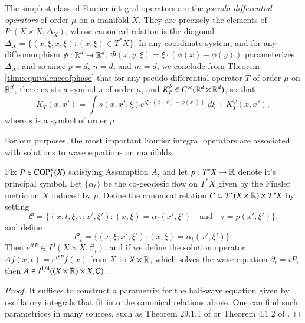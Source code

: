 The simplest class of Fourier integral operators are the \emph{pseudo-differential operators} of order $\mu$ on a manifold $X$. They are precisely the elements of $I^\mu( X \times X, \Delta_X )$, whose canonical relation is the diagonal $\Delta_X = \{ (x,\xi,x,\xi): (x,\xi) \in T^* X \}$. In any coordinate system, and for any diffeomorphism $\phi: \operatorname{\mathbb{R}}^d \to \operatorname{\mathbb{R}}^d$, $\Phi(x,y,\xi) = \xi \cdot (\phi(x) - \phi(y))$ parameterizes $\Delta_X$, and so since $p = d$, $n = d$, and $m = d$, we conclude from Theorem \ref{thm:equivalenceofphase} that for any pseudo-differential operator $T$ of order $\mu$ on $\operatorname{\mathbb{R}}^d$, there exists a symbol $s$ of order $\mu$, and $K^\psi_T \in C^\infty(\operatorname{\mathbb{R}}^d \times \operatorname{\mathbb{R}}^d)$, so that
%
\begin{equation}
  K_T(x,x') = \int s(x,x',\xi) e^{i \xi \cdot (\phi(x) - \phi(x'))}\; d\xi + K^\psi_T(x,x'),
\end{equation}
%
where $s$ is a symbol of order $\mu$.

For our purposes, the most important Fourier integral operators are associated with solutions to wave equations on manifolds.

\begin{theorem} \label{waveisanFIOTheorem}
  Fix $P \in {\text{COP}^{+}_{{1}}}(X)$ satisfying Assumption $A$, and let $p: T^* X \to \operatorname{\mathbb{R}}$ denote it's principal symbol. Let $\{ \alpha_t \}$ be the co-geodesic flow on $T^* X$ given by the Finsler metric on $X$ induced by $p$.  Define the canonical relation $\mathcal{C} \subset T^* (X \times \operatorname{\mathbb{R}}) \times T^* X$ by setting
  \[ \mathcal{C} = \{ (x,t,\xi,\tau ; x',\xi') : (x,\xi) = \alpha_t(x',\xi') \quad\text{and}\quad \tau = p(x',\xi') \}. \]
  and define
  \[ \mathcal{C}_t = \{ (x,\xi;x',\xi') : (x,\xi) = \alpha_t(x',\xi') \}. \]
  Then $e^{itP} \in I^0(X \times X, \mathcal{C}_t)$, and if we define the solution operator $Af(x,t) = e^{i t P}\!f(x)$ from $X$ to $X \times \operatorname{\mathbb{R}}$, which solves the wave equation $\partial_t = i P$, then $A \in I^{1/4}((X \times \operatorname{\mathbb{R}}) \times X, \mathcal{C})$.
\end{theorem}
\begin{proof}
  It suffices to construct a parametrix for the half-wave equation given by oscillatory integrals that fit into the canonical relations above. One can find such parametrices in many sources, such as Theorem 29.1.1 of \cite{Hormander4} or Theorem 4.1.2 of \cite{Sogge}.
\end{proof}

